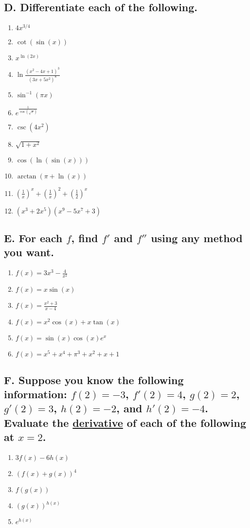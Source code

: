 \documentclass{article}
\begin{document}
\subsection*{D. Differentiate each of the following.}
\begin{multicols}{3}
\begin{enumerate}
\item $4x^{3/4}$
\item $\cot(\sin(x))$
\item $x^{\ln(2x)}$
\item $\ln\frac{(x^2-4x+1)^3}{(3x+5x^2)^8}$
\item $\sin^{-1}(\pi x)$
\item $e^{\frac{1}{\cos(\sqrt{x})}}$
\item $\csc(4x^2)$
\item $\sqrt{1+x^2}$
\item $\cos(\ln(\sin(x)))$
\item $\arctan(\pi +\ln(x))$
\item $\left(\frac{1}{x}\right)^x+\left(\frac{1}{x}\right)^2+\left(\frac{1}{2}\right)^x$
\item $(x^3+2x^5)(x^{9}-5x^7+3)$
\end{enumerate}
\end{multicols}

\subsection*{E. For each $f$, find $f'$ and $f''$ using any method you want.}
\begin{multicols}{3}
\begin{enumerate}
\item $f(x)=3x^3-\frac{4}{x^2}$
\item $f(x)=x\sin(x)$
\item $f(x)=\frac{x^2+3}{x-4}$
\item $f(x)=x^2\cos(x)+x\tan(x)$
\item $f(x)=\sin(x)\cos(x)e^x$
\item $f(x)=x^5+x^4+\pi^3+x^2+x+1$
\end{enumerate}
\end{multicols}


\subsection*{F. Suppose you know the following information: $f(2)=-3$, $f'(2)=4$, $g(2)=2$, $g'(2)=3$, $h(2)=-2$, and $h'(2)=-4$. Evaluate the \underline{derivative} of each of the following at $x=2$.}
\begin{multicols}{5}
\begin{enumerate}
\item $3f(x)-6h(x)$ 
\item $(f(x)+g(x))^4$
\item $f(g(x))$
\item $(g(x))^{h(x)}$
\item $e^{h(x)}$
\end{enumerate}
\end{multicols}
\end{document}
